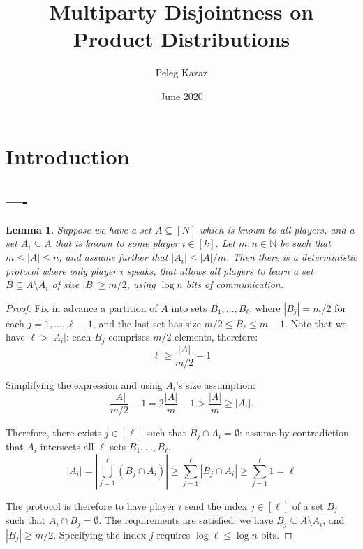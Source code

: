 \documentclass{article}
\title{Multiparty Disjointness on Product Distributions}
\author{Peleg Kazaz}
\date{June 2020}
\newcommand{\nat}{\mathbb{N}}
\theoremstyle{plain}
\newtheorem{lemma}[theorem]{Lemma}
\begin{document}
\maketitle


\section{Introduction}

\subsection{----}

\begin{lemma}
  Suppose we have a set $A \subseteq [N]$ which is known to all players, and a set $A_i \subseteq A$ that is known to some player $i \in [k]$.
  Let $m, n \in \nat$ be such that $m \leq |A| \leq n$, and assume further that $|A_i| \leq |A|/m$.
  Then there is a deterministic protocol where only player $i$ speaks,
  that allows all players to learn a set $B \subseteq A \setminus A_i$
  of size $|B| \geq m/2$,
  using $\log n$ bits of communication.
  \label{lemma:reveal_zeroes}
\end{lemma}
\begin{proof}
  Fix in advance a partition of $A$ into sets $B_1,\ldots,B_{\ell}$,
  where $|B_j| = m/2$ for each $j = 1,\ldots,\ell-1$,
  and the last set has size $m/2 \leq B_{\ell} \leq m - 1$.
  Note that we have $\ell > |A_i|$: \newline
  each $B_j$ comprises $m/2$ elements, therefore:
  \begin{equation*}
    \ell \geq \frac{|A|}{m/2} - 1
  \end{equation*}
  
  Simplifying the expression and using $A_i$'s size assumption:
  \begin{equation*}
    \frac{|A|}{m/2} - 1 =  2\frac{|A|}{m} - 1 > \frac{|A|}{m} \geq |A_i|.
  \end{equation*}
   
  
  Therefore, there exists $j \in [\ell]$ such that $B_j \cap A_i = \emptyset$:
  assume by contradiction that $A_i$ intersects all $\ell$ sets $B_1,\ldots,B_{\ell}$. 
  \begin{equation*}
  |A_i| = |\bigcup_{j=1}^{\ell}\left(B_j \cap A_i \right)| \geq \sum_{j=1}^{\ell} |B_j \cap A_i| \geq \sum_{j=1}^{\ell}1 = \ell
  \end{equation*}

  The protocol is therefore to have player $i$ send the index $j \in [\ell]$ of a set $B_j$
  such that $A_i \cap B_j = \emptyset$.
  The requirements are satisfied: we have $B_j \subseteq A \setminus A_i$,
  and $|B_j| \geq m / 2$.
  Specifying the index $j$ requires $\log \ell \leq \log n$ bits.
  
\end{proof}
\end{document}
